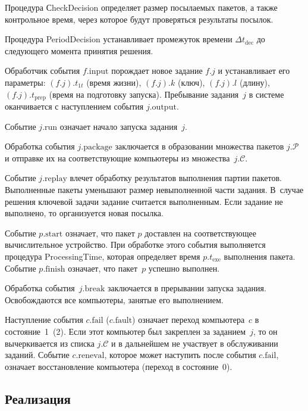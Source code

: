 \begin{multicols}{2}
    Процедура {\sf СheckDecision} определяет размер посылаемых пакетов, 
а также контрольное время, через которое будут проверяться результаты 
посылок.
    
    Процедура {\sf PeriodDecision} устанавливает промежуток времени 
$\Delta t_{\mathrm{dec}}$ до следующего момента принятия решения.
    
    Обработчик события $f.\mathrm{input}$ порождает новое задание $f.j$ и 
устанавливает его параметры: $(f.j).t_{1t}$ (время жизни), $(f.j).k$ 
(ключ), $(f.j).l$ (длину), $(f.j).t_{\mathrm{prep}}$ (время на подготовку 
запуска). Пребывание задания~$j$ в системе оканчивается с наступлением 
события $j.\mathrm{output}$.
    
    Событие $j.\mathrm{run}$ означает начало запуска задания~$j$.
    
    Обработка события $j.\mathrm{package}$ заключается в образовании множества 
пакетов $j.\mathcal{P}$ и отправке их на соответствующие компьютеры из 
множества~$j.\mathcal{C}$.
    
    Событие $j.\mathrm{replay}$ влечет обработку результатов выполнения партии 
пакетов. Выполненные пакеты уменьшают размер невыполненной части 
задания. В~случае решения ключевой задачи задание считается 
выполненным. Если задание не выполнено, то организуется новая посылка.
    
    Событие $p.\mathrm{start}$ означает, что пакет $p$ до\-став\-лен на соответствующее 
вычислительное устройство. При обработке этого события выполняется 
процедура {\sf ProcessingTime}, которая определяет время 
$p.t_{\mathrm{exe}}$ выполнения пакета. Событие $p.\mathrm{finish}$ означает, что 
пакет~$p$ успешно выполнен.
    
    Обработка события~$j.\mathrm{break}$ заключается в прерывании запуска 
задания. Освобождаются все компьютеры, занятые его выполнением.
    
    Наступление события $c.\mathrm{fail}$ ($c.\mathrm{fault}$) означает переход 
компьютера~$c$ в состояние~1~(2). Если этот компьютер был закреплен за 
заданием~$j$, то он вычеркивается из списка $j.\mathcal{C}$ и в дальнейшем не 
участвует в обслуживании заданий. Событие $c.\mathrm{reneval}$, которое может 
наступить после события $c.\mathrm{fail}$, означает восстановление компьютера 
(переход в состояние~0).

\subsection{Реализация}
    

\end{multicols}
